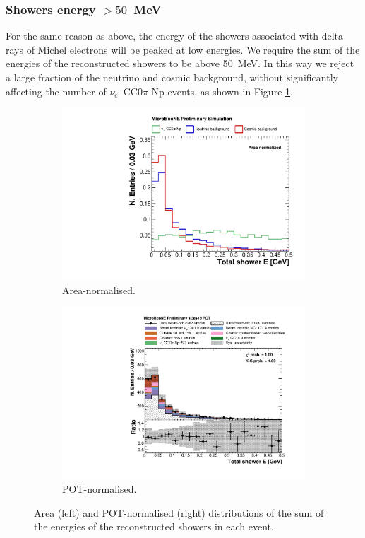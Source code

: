 \subsubsection*{Showers energy $>50$~MeV} 
For the same reason as above, the energy of the showers associated with delta rays of Michel electrons will be peaked at low energies. We require the sum of the energies of the reconstructed showers to be above 50~MeV. In this way we reject a large fraction of the neutrino and cosmic background, without significantly affecting the number of $\nu_e$~CC0$\pi$-Np events, as shown in Figure \ref{fig:shower_energy_integral}.

\begin{figure}[htbp]
\centering
  \begin{subfigure}{0.49\textwidth}
    \includegraphics[width=\linewidth]{figures/shower_energy_norm.pdf}
    \caption{Area-normalised.} \label{fig:shower_energy_integral}
  \end{subfigure}
    \begin{subfigure}{0.49\textwidth}
    \includegraphics[width=\linewidth]{figures/shower_energy_pot.pdf}
    \caption{POT-normalised.} \label{fig:shower_energy_pot}
  \end{subfigure}
  \caption{Area (left) and POT-normalised (right) distributions of the sum of the energies of the reconstructed showers in each event.}
\end{figure}


